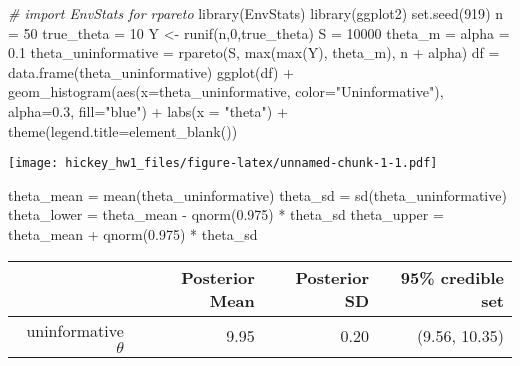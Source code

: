 \documentclass[
]{article}
\newenvironment{Shaded}{\begin{snugshade}}{\end{snugshade}}
\newcommand{\AttributeTok}[1]{\textcolor[rgb]{0.77,0.63,0.00}{#1}}
\newcommand{\CommentTok}[1]{\textcolor[rgb]{0.56,0.35,0.01}{\textit{#1}}}
\newcommand{\DecValTok}[1]{\textcolor[rgb]{0.00,0.00,0.81}{#1}}
\newcommand{\FloatTok}[1]{\textcolor[rgb]{0.00,0.00,0.81}{#1}}
\newcommand{\FunctionTok}[1]{\textcolor[rgb]{0.00,0.00,0.00}{#1}}
\newcommand{\NormalTok}[1]{#1}
\newcommand{\OtherTok}[1]{\textcolor[rgb]{0.56,0.35,0.01}{#1}}
\newcommand{\SpecialCharTok}[1]{\textcolor[rgb]{0.00,0.00,0.00}{#1}}
\newcommand{\StringTok}[1]{\textcolor[rgb]{0.31,0.60,0.02}{#1}}
\begin{document}
\begin{Shaded}
\begin{Highlighting}[]
\CommentTok{\# import EnvStats for rpareto }
\FunctionTok{library}\NormalTok{(EnvStats)}
\FunctionTok{library}\NormalTok{(ggplot2)}
\FunctionTok{set.seed}\NormalTok{(}\DecValTok{919}\NormalTok{)}
\NormalTok{n }\OtherTok{=} \DecValTok{50}
\NormalTok{true\_theta }\OtherTok{=} \DecValTok{10}
\NormalTok{Y }\OtherTok{\textless{}{-}} \FunctionTok{runif}\NormalTok{(n,}\DecValTok{0}\NormalTok{,true\_theta)}
\NormalTok{S }\OtherTok{=} \DecValTok{10000}
\NormalTok{theta\_m }\OtherTok{=}\NormalTok{ alpha }\OtherTok{=} \FloatTok{0.1}
\NormalTok{theta\_uninformative }\OtherTok{=} \FunctionTok{rpareto}\NormalTok{(S, }\FunctionTok{max}\NormalTok{(}\FunctionTok{max}\NormalTok{(Y), theta\_m), n }\SpecialCharTok{+}\NormalTok{ alpha)}
\NormalTok{df }\OtherTok{=} \FunctionTok{data.frame}\NormalTok{(theta\_uninformative)}
\FunctionTok{ggplot}\NormalTok{(df) }\SpecialCharTok{+} 
  \FunctionTok{geom\_histogram}\NormalTok{(}\FunctionTok{aes}\NormalTok{(}\AttributeTok{x=}\NormalTok{theta\_uninformative, }\AttributeTok{color=}\StringTok{"Uninformative"}\NormalTok{), }\AttributeTok{alpha=}\FloatTok{0.3}\NormalTok{, }\AttributeTok{fill=}\StringTok{"blue"}\NormalTok{) }\SpecialCharTok{+}
  \FunctionTok{labs}\NormalTok{(}\AttributeTok{x =} \StringTok{"theta"}\NormalTok{) }\SpecialCharTok{+}
  \FunctionTok{theme}\NormalTok{(}\AttributeTok{legend.title=}\FunctionTok{element\_blank}\NormalTok{())}
\end{Highlighting}
\end{Shaded}

\texttt{[image: hickey\_hw1\_files/figure-latex/unnamed-chunk-1-1.pdf]}

\begin{Shaded}
\begin{Highlighting}[]
\NormalTok{theta\_mean }\OtherTok{=} \FunctionTok{mean}\NormalTok{(theta\_uninformative)}
\NormalTok{theta\_sd }\OtherTok{=} \FunctionTok{sd}\NormalTok{(theta\_uninformative)}
\NormalTok{theta\_lower }\OtherTok{=}\NormalTok{ theta\_mean }\SpecialCharTok{{-}} \FunctionTok{qnorm}\NormalTok{(}\FloatTok{0.975}\NormalTok{) }\SpecialCharTok{*}\NormalTok{ theta\_sd}
\NormalTok{theta\_upper }\OtherTok{=}\NormalTok{ theta\_mean }\SpecialCharTok{+} \FunctionTok{qnorm}\NormalTok{(}\FloatTok{0.975}\NormalTok{) }\SpecialCharTok{*}\NormalTok{ theta\_sd}
\end{Highlighting}
\end{Shaded}

\begin{longtable}[]{@{}rrrr@{}}
\toprule
& Posterior Mean & Posterior SD & 95\% credible set\tabularnewline
\midrule
\endhead
uninformative \(\theta\) & 9.95 & 0.20 & (9.56, 10.35)\tabularnewline
\bottomrule
\end{longtable}
\end{document}
